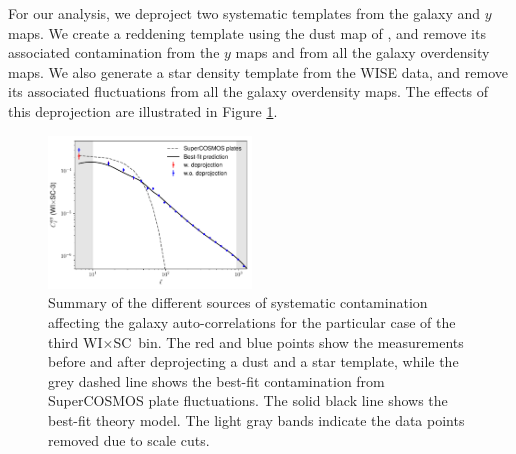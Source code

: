 \documentclass[useAMS,usenatbib]{mn2e}
\newcommand{\wisc}{WI$\times$SC}
\begin{document}
      For our analysis, we deproject two systematic templates from the galaxy and $y$ maps. We create a reddening template using the dust map of \cite{1998ApJ...500..525S}, and remove its associated contamination from the $y$ maps and from all the galaxy overdensity maps. We also generate a star density template from the WISE data, and remove its associated fluctuations from all the galaxy overdensity maps. The effects of this deprojection are illustrated in Figure \ref{fig:clsyst}.
      \begin{figure}
        \centering
        \includegraphics[width=0.48\textwidth]{cl_syst_summary.pdf}
        \caption{Summary of the different sources of systematic contamination affecting the galaxy auto-correlations for the particular case of the third \wisc~bin. The red and blue points show the measurements before and after deprojecting a dust and a star template, while the grey dashed line shows the best-fit contamination from SuperCOSMOS plate fluctuations. The solid black line shows the best-fit theory model. The light gray bands indicate the data points removed due to scale cuts.}
        \label{fig:clsyst}
      \end{figure}
\end{document}
